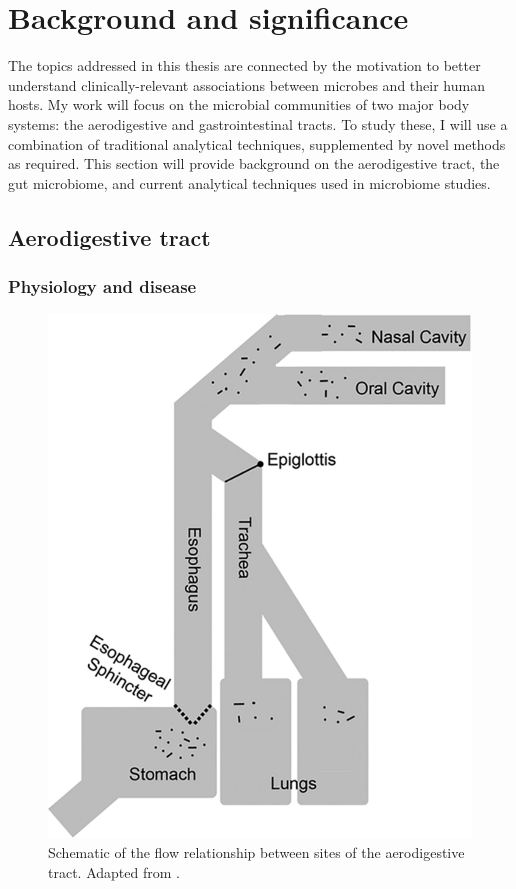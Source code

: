 \documentclass[12pt]{article}
\begin{document}
\section{Background and significance}

The topics addressed in this thesis are connected by
the motivation to better understand
clinically-relevant associations between microbes and their human hosts.
My work will focus on the microbial communities of two major body systems:
the aerodigestive and gastrointestinal tracts. To study these, I will 
use a combination of traditional analytical techniques, supplemented by 
novel methods as required. This section will provide background on
the aerodigestive tract, the gut microbiome, and current analytical techniques 
used in microbiome studies. 

\subsection{Aerodigestive tract}

\subsubsection{Physiology and disease}

\begin{figure}
\begin{center}
    \includegraphics[scale=0.35]{aero_tract}
    \caption{Schematic of the flow relationship between sites of the 
    aerodigestive tract. Adapted from \cite{bassis-source-2015}.}\label{fig:aero_tract}
\end{center}
\end{figure}
\end{document}
